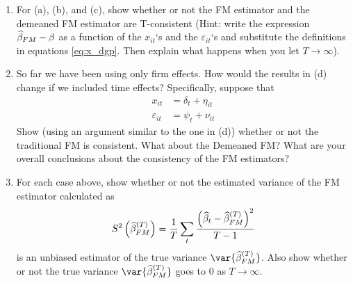 \begin{enumerate}[label = (\alph*)]
\item For (a), (b), and (c), show whether or not the FM estimator and the demeaned FM estimator are T-consistent (Hint: write the expression \(\widehat{\beta}_{FM}-\beta\) as a function of the \(x_{it}\)`s and the \(\varepsilon_{it}\)`s and substitute the definitions in equations \ref{eq:x_dgp}. Then explain what happens when you let \(T \to \infty\)).

\item So far we have been using only firm effects. How would the results in (d) change if we included time effects? Specifically, suppose that
\begin{align*}
    x_{it} & = \delta_t+\eta_{it} \\
    \varepsilon_{it} & = \psi_t+\nu_{it}
\end{align*}
Show (using an argument similar to the one in (d)) whether or not the traditional FM is consistent. What about the Demeaned FM? What are your overall conclusions about the consistency of the FM estimators?

\item For each case above, show whether or not the estimated variance of the FM estimator calculated as 
\[
    S^2\left( \widehat{\beta}^{(T)}_{FM} \right) = \frac{1}{T} \sum_t \frac{\left( \widehat{\beta}_t-\widehat{\beta}_{FM}^{(T)} \right)^2}{T-1}
\]
is an unbiased estimator of the true variance \(\var{\wh\beta_{FM}^{(T)}}\). Also show whether or not the true variance \(\var{\wh\beta^{(T)}_{FM}}\) goes to 0 as \(T \to \infty\).
\end{enumerate}
